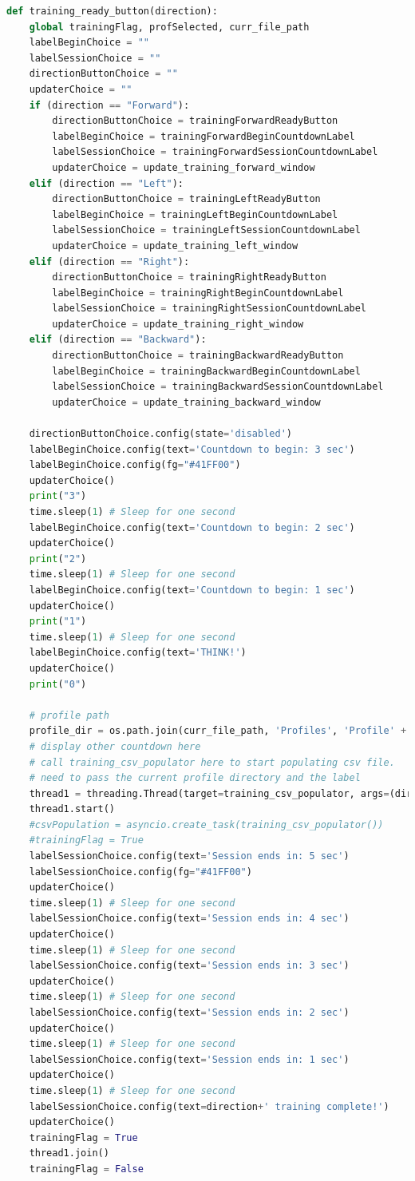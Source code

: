 \documentclass[conference]{IEEEtran}
\begin{document}
\begin{lstlisting}[language=Python, caption=GUI CODE, label=gui_code]
def training_ready_button(direction):
    global trainingFlag, profSelected, curr_file_path
    labelBeginChoice = ""
    labelSessionChoice = ""
    directionButtonChoice = ""
    updaterChoice = ""
    if (direction == "Forward"):
        directionButtonChoice = trainingForwardReadyButton
        labelBeginChoice = trainingForwardBeginCountdownLabel
        labelSessionChoice = trainingForwardSessionCountdownLabel
        updaterChoice = update_training_forward_window
    elif (direction == "Left"):
        directionButtonChoice = trainingLeftReadyButton
        labelBeginChoice = trainingLeftBeginCountdownLabel
        labelSessionChoice = trainingLeftSessionCountdownLabel
        updaterChoice = update_training_left_window
    elif (direction == "Right"):
        directionButtonChoice = trainingRightReadyButton
        labelBeginChoice = trainingRightBeginCountdownLabel
        labelSessionChoice = trainingRightSessionCountdownLabel
        updaterChoice = update_training_right_window
    elif (direction == "Backward"):
        directionButtonChoice = trainingBackwardReadyButton
        labelBeginChoice = trainingBackwardBeginCountdownLabel
        labelSessionChoice = trainingBackwardSessionCountdownLabel
        updaterChoice = update_training_backward_window

    directionButtonChoice.config(state='disabled')
    labelBeginChoice.config(text='Countdown to begin: 3 sec')
    labelBeginChoice.config(fg="#41FF00")
    updaterChoice()
    print("3")
    time.sleep(1) # Sleep for one second
    labelBeginChoice.config(text='Countdown to begin: 2 sec')
    updaterChoice()
    print("2")
    time.sleep(1) # Sleep for one second
    labelBeginChoice.config(text='Countdown to begin: 1 sec')
    updaterChoice()
    print("1")
    time.sleep(1) # Sleep for one second
    labelBeginChoice.config(text='THINK!')
    updaterChoice()
    print("0")
    
    # profile path 
    profile_dir = os.path.join(curr_file_path, 'Profiles', 'Profile' + profSelected)
    # display other countdown here
    # call training_csv_populator here to start populating csv file.
    # need to pass the current profile directory and the label
    thread1 = threading.Thread(target=training_csv_populator, args=(direction, profile_dir))
    thread1.start()
    #csvPopulation = asyncio.create_task(training_csv_populator())
    #trainingFlag = True
    labelSessionChoice.config(text='Session ends in: 5 sec')
    labelSessionChoice.config(fg="#41FF00")
    updaterChoice()
    time.sleep(1) # Sleep for one second
    labelSessionChoice.config(text='Session ends in: 4 sec')
    updaterChoice()
    time.sleep(1) # Sleep for one second
    labelSessionChoice.config(text='Session ends in: 3 sec')
    updaterChoice()
    time.sleep(1) # Sleep for one second
    labelSessionChoice.config(text='Session ends in: 2 sec')
    updaterChoice()
    time.sleep(1) # Sleep for one second
    labelSessionChoice.config(text='Session ends in: 1 sec')
    updaterChoice()
    time.sleep(1) # Sleep for one second
    labelSessionChoice.config(text=direction+' training complete!')
    updaterChoice()
    trainingFlag = True
    thread1.join()
    trainingFlag = False
    

\end{lstlisting}
\end{document}
